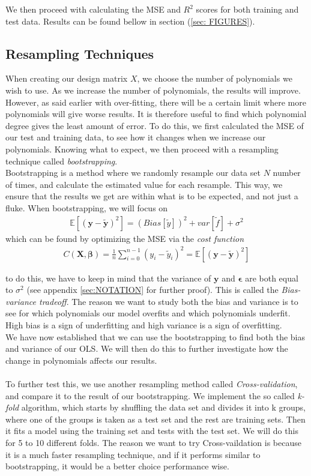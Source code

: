 \documentclass[english,notitlepage,reprint,nofootinbib]{revtex4-1}  %
\begin{document}
We then proceed with calculating the MSE and $R^2$ scores for both training and test data. Results can be found bellow in section (\ref{sec: FIGURES}).

\subsection{Resampling Techniques}\label{subsec:RESAMPLING}
When creating our design matrix $X$, we choose the number of polynomials we wish to use. As we increase the number of polynomials, the results will improve. However, as said earlier with over-fitting, there will be a certain limit where more polynomials will give worse results. It is therefore useful to find which polynomial degree gives the least amount of error. To do this, we first calculated the MSE of our test and training data, to see how it changes when we increase our polynomials. Knowing what to expect, we then proceed with a resampling technique called \textit{bootstrapping}.
\\
Bootstrapping is a method where we randomly resample our data set $N$ number of times, and calculate the estimated value for each resample. This way, we ensure that the results we get are within what is to be expected, and not just a fluke. When bootstrapping, we will focus on 
\begin{align}
    \mathbb{E}[(\textbf{y} - \mathbf{\tilde y})^2] = (Bias[\tilde y])^2 + var[\tilde f] + \sigma^2
\end{align}
which can be found by optimizing the MSE via the \textit{cost function}
\begin{align}
    C(\mathbf{X}, \mathbf{\beta}) = \frac{1}{n} \sum_{i = 0}^{n - 1} (y_i - \tilde y_i)^2 = \mathbb{E}[(\textbf{y} - \mathbf{\tilde y})^2] 
\end{align}

to do this, we have to keep in mind that the variance of $\mathbf{y}$ and $\mathbf{\epsilon}$ are both equal to $\sigma^2$ (see appendix \ref{sec:NOTATION} for further proof).
This is called the \textit{Bias-variance tradeoff}. The reason we want to study both the bias and variance is to see for which polynomials our model overfits and which polynomials underfit. High bias is a sign of underfitting and high variance is a sign of overfitting.
\\
We have now established that we can use the bootstrapping to find both the bias and variance of our OLS. We will then do this to further investigate how the change in polynomials affects our results.
\\
\\
To further test this, we use another resampling method called \textit{Cross-validation}, and compare it to the result of our bootstrapping. We implement the so called \textit{k-fold} algorithm, which starts by shuffling the data set and divides it into k groups, where one of the groups is taken as a test set and the rest are training sets. Then it fits a model using the training set and tests with the test set. We will do this for 5 to 10 different folds. The reason we want to try Cross-vaildation is because it is a much faster resampling technique, and if it performs similar to bootstrapping, it would be a better choice performance wise.
\end{document}
